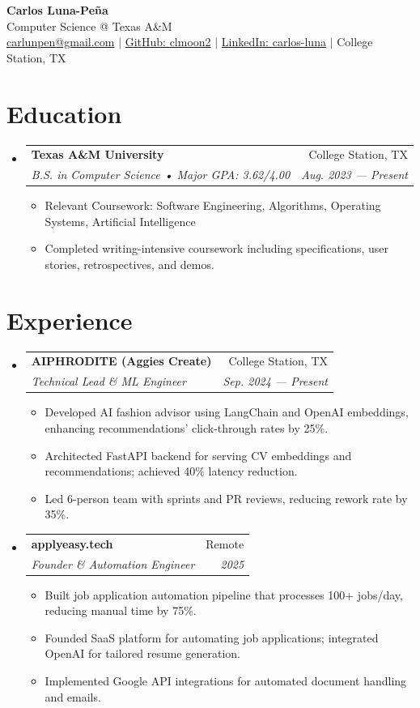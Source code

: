 \documentclass[letterpaper,11pt]{article}
\makeatletter
\newcommand{\resumeItem}[1]{
  \item\small{{#1 \vspace{-2pt}}}
}
\newcommand{\resumeSubheading}[4]{
  \vspace{-2pt}\item
    \begin{tabular*}{0.97\textwidth}[t]{l@{\extracolsep{\fill}}r}
      \textbf{#1} & #2 \\
      \textit{\small#3} & \textit{\small #4} \\
    \end{tabular*}\vspace{-7pt}
}
\newcommand{\resumeSubHeadingListStart}{\begin{itemize}[leftmargin=0.15in, label={}]}
\newcommand{\resumeSubHeadingListEnd}{\end{itemize}}
\newcommand{\resumeItemListStart}{\begin{itemize}}
\newcommand{\resumeItemListEnd}{\end{itemize}\vspace{-5pt}}
\makeatother
\begin{document}
\begin{center}
    \textbf{\LARGE Carlos Luna-Peña} \\
    \vspace{1mm}
    Computer Science @ Texas A\&M \\
    \vspace{1mm}
    \href{mailto:carlunpen@gmail.com}{carlunpen@gmail.com} $|$ \href{https://github.com/clmoon2}{GitHub: clmoon2} $|$ \href{https://linkedin.com/in/carlos-luna}{LinkedIn: carlos-luna} $|$ College Station, TX \\
\end{center}

\section{Education}
\resumeSubHeadingListStart
\resumeSubheading
{Texas A\&M University}{College Station, TX}
{B.S. in Computer Science • Major GPA: 3.62/4.00}{Aug. 2023 — Present}
\resumeItemListStart
\resumeItem{Relevant Coursework: Software Engineering, Algorithms, Operating Systems, Artificial Intelligence}
\resumeItem{Completed writing-intensive coursework including specifications, user stories, retrospectives, and demos.}
\resumeItemListEnd
\resumeSubHeadingListEnd

\section{Experience}
\resumeSubHeadingListStart
\resumeSubheading
{AIPHRODITE (Aggies Create)}{College Station, TX}
{Technical Lead \& ML Engineer}{Sep. 2024 — Present}
\resumeItemListStart
\resumeItem{Developed AI fashion advisor using LangChain and OpenAI embeddings, enhancing recommendations' click-through rates by 25\%.}
\resumeItem{Architected FastAPI backend for serving CV embeddings and recommendations; achieved 40\% latency reduction.}
\resumeItem{Led 6-person team with sprints and PR reviews, reducing rework rate by 35\%.}
\resumeItemListEnd

\resumeSubheading
{applyeasy.tech}{Remote}
{Founder \& Automation Engineer}{2025}
\resumeItemListStart
\resumeItem{Built job application automation pipeline that processes 100+ jobs/day, reducing manual time by 75\%.}
\resumeItem{Founded SaaS platform for automating job applications; integrated OpenAI for tailored resume generation.}
\resumeItem{Implemented Google API integrations for automated document handling and emails.}
\resumeItemListEnd
\resumeSubHeadingListEnd
\end{document}
